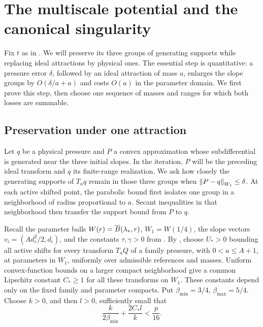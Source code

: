 \section{The multiscale potential and the canonical singularity}
\label{sec:iteration}

Fix \(t\) as in .  We will preserve its
three groups of generating supports while replacing ideal attractions
by physical ones.  The essential step is quantitative: a pressure error
\(\delta\), followed by an ideal attraction of mass \(a\), enlarges
the slope groups by \(O(\delta/a+a)\) and costs \(O(a)\) in the
parameter domain.  We first prove this step, then choose one sequence
of masses and ranges for which both losses are summable.

\subsection{Preservation under one attraction}

Let \(q\) be a physical pressure and \(P\) a convex approximation
whose subdifferential is generated near the three initial slopes.
In the iteration, \(P\) will be the preceding ideal transform and
\(q\) its finite-range realization.  We ask how closely the generating
supports of \(T_aq\) remain in those three groups when
\(\left\lVert P-q\right\rVert_{W_1}\le\delta\).  At each active shifted point, the
parabolic bound first isolates one group in a neighborhood of radius
proportional to \(a\).  Secant inequalities in that neighborhood then
transfer the support bound from \(P\) to \(q\).

Recall the parameter balls
\(W(r)=\overline B(\lambda_*,r)\), \(W_1=W(1/4)\),
the slope vectors \(v_i=(Ad_i^2/2,d_i)\), and the constants
\(\tau,\gamma>0\) from .
By , choose \(U_*>0\) bounding all active
shifts for every transform \(T_aQ\) of a family pressure, with \(0<a\le A+1\), at parameters
in \(W_1\), uniformly over admissible references and masses.
Uniform convex-function bounds on a larger compact neighborhood give a
common Lipschitz constant \(C_*\ge1\) for all these transforms on \(W_1\).
These constants depend only on the fixed family and parameter compacts.
Put \(\beta_{\min}=3/4\), \(\beta_{\max}=5/4\).
Choose \(k>0\), and then \(l>0\), sufficiently small that
\begin{equation}\label{eq:band-constants}
 \frac{k}{2\beta_{\min}}+\frac{2C_*l}{k}<\frac p{16}.
\end{equation}

